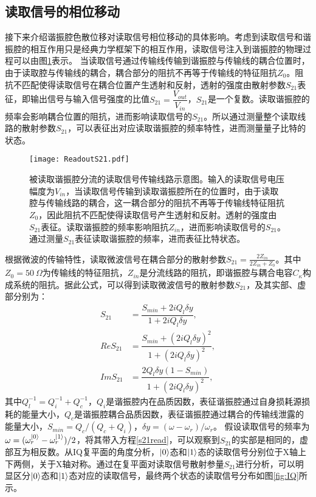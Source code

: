 \subsection{读取信号的相位移动}
接下来介绍谐振腔色散位移对读取信号相位移动的具体影响。考虑到读取信号和谐振腔的相互作用只是经典力学框架下的相互作用，读取信号注入到谐振腔的物理过程可以由图\ref{fig:ReadoutS21}表示。
当读取信号通过传输线传输到谐振腔与传输线的耦合位置时，由于读取腔与传输线的耦合，耦合部分的阻抗不再等于传输线的特征阻抗$ Z_{0}$。阻抗不匹配使得读取信号在耦合位置产生透射和反射，透射的强度由散射参数$ S_{21}$表征，即输出信号与输入信号强度的比值$ S_{21} = \dfrac{V_{out}}{V_{in}}$，$S_{21}$是一个复数。读取谐振腔的频率会影响耦合位置的阻抗，进而影响读取信号的$S_{21}$。所以通过测量整个读取线路的散射参数$S_{21}$，可以表征出对应读取谐振腔的频率特性，进而测量量子比特的状态。
\begin{figure}[h]
	\centering
	\texttt{[image: ReadoutS21.pdf]}
	\caption{被读取谐振腔分流的读取信号传输线路示意图。输入的读取信号电压幅度为$ V_{in}$，当读取信号传输到读取谐振腔所在的位置时，由于读取腔与传输线路的耦合，这一耦合部分的阻抗不再等于传输线特征阻抗$ Z_{0}$，因此阻抗不匹配使得读取信号产生透射和反射。透射的强度由$S_{21}$表征。读取谐振腔的频率影响阻抗$ Z_{in}$，进而影响读取信号的$ S_{21}$。通过测量$S_{21}$表征读取谐振腔的频率，进而表征比特状态。}
	\label{fig:ReadoutS21}
\end{figure}

根据微波的传输特性，读取微波信号在耦合部分的散射参数$S_{21}=\frac{2Z_{in}}{2Z_{in}+Z_{0}}$\cite{pozar2011microwave}。其中$ Z_{0}=50\  \Omega$为传输线的特征阻抗，$Z_{in}$是分流线路的阻抗，即谐振腔与耦合电容$ C_{\kappa}$构成系统的阻抗。据此公式，可以得到读取微波信号的散射参数$S_{21}$，及其实部、虚部分别为\cite{mazin2005microwave,megrant2012planar}：
\begin{align}\label{s21read}
	S_{21} &= \dfrac{S_{min}+2{i}Q_{l}\delta y}{1+2{i}Q_{l}\delta y},\\
	ReS_{21} &= \dfrac{S_{min}+(2{i}Q_{l}\delta y)^{2}}{1+(2{i}Q_{l}\delta y)^{2}},\\
	ImS_{21} &= \dfrac{2Q_{l}\delta y (1-S_{min})}{1+(2{i}Q_{l}\delta y)^{2}},
\end{align}
其中$ Q_{l}^{-1}=Q_{i}^{-1}+Q_{c}^{-1}$，$ Q_{i}$是谐振腔内在品质因数，表征谐振腔通过自身损耗源损耗的能量大小，$Q_{c}$是谐振腔耦合品质因数，表征谐振腔通过耦合的传输线泄露的能量大小，$S_{min}=Q_{c}/(Q_{c}+Q_{i})$，$ \delta y = (\omega-\omega_{r})/\omega_{r}$。
假设读取信号的频率为$\omega=(\omega_{r}^{\left|0\right>}-\omega_{r}^{\left|1\right>})/2$，将其带入方程\ref{s21read}，可以观察到$ S_{21}$的实部是相同的，虚部互为相反数。从IQ复平面的角度分析，$\left|0\right>$态和$\left|1\right>$态的读取信号分别位于X轴上下两侧，关于X轴对称。通过在复平面对读取信号散射参量$ S_{21}$进行分析，可以明显区分$\left|0\right>$态和$\left|1\right>$态对应的读取信号，最终两个状态的读取信号分布如图\ref{fig:IQ}所示。


